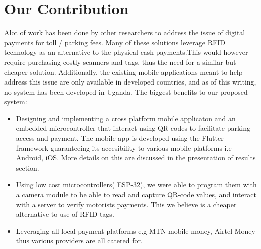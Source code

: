 \section{Our Contribution}
Alot of work has been done by other researchers to address the issue of digital payments for toll / parking fees. Many of these solutions leverage RFID technology as an alternative to the physical cash payments.This would however require purchasing costly scanners and tags, thus the need for a similar but cheaper solution. Additionally, the existing mobile applications meant to help address this issue are only available in developed countries, and as of this writing, no system has been developed in Uganda.
The biggest benefits to our proposed system:
\begin{itemize}
    \item Designing and implementing a cross platform mobile applicaton and an embedded microcontroller that interact using QR codes to facilitate parking access and payment. The mobile app is developed using the Flutter framework guaranteeing its accesibility to various mobile platforms i.e Android, iOS. More details on this are discussed in the presentation of results section.
    \item Using low cost microcontrollers( ESP-32), we were able to program them with a camera module to be able to read and capture QR-code values, and interact with a server to verify motorists payments. This we believe is a cheaper alternative to use of RFID tags.
    \item Leveraging all local payment platforms e.g MTN mobile money, Airtel Money thus various providers are all catered for.
\end{itemize}
